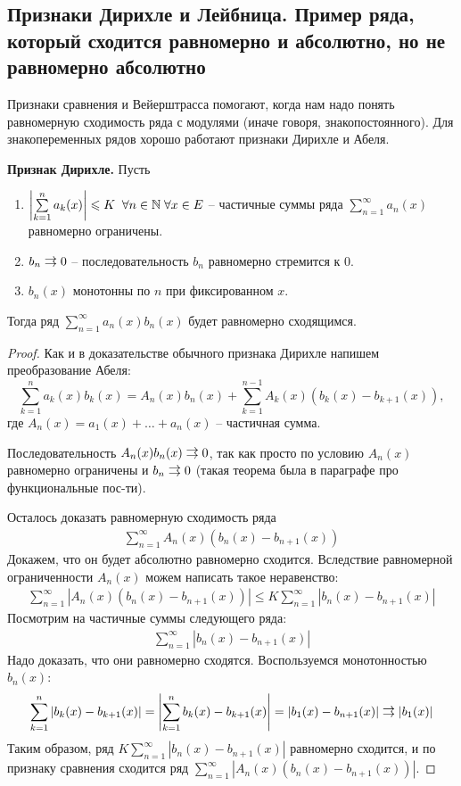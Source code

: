 \subsection{Признаки Дирихле и Лейбница. Пример ряда, который сходится равномерно и абсолютно, но не равномерно абсолютно}
Признаки сравнения и Вейерштрасса помогают, когда нам надо понять равномерную сходимость ряда с модулями (иначе говоря, знакопостоянного).
Для знакопеременных рядов хорошо работают признаки Дирихле и Абеля.

\textbf{Признак Дирихле.} 
Пусть \begin{enumerate}
    \item $\left| \sum\limits_{k = 1}^n a_k(x) \right| \leqslant K \;\; \forall n \in \mathbb{N} \; \forall x \in E$ -- частичные суммы ряда $\sum\limits_{n = 1}^\infty a_n(x)$ равномерно ограничены.
    \item $b_n \doublerightarrow 0$ -- последовательность $b_n$ равномерно стремится к 0.
    \item $b_n(x)$ монотонны по $n$ при фиксированном $x$.
\end{enumerate}
Тогда ряд $\sum\limits_{n = 1}^\infty a_n(x)b_n(x)$ будет равномерно сходящимся.

\begin{proof}
    Как и в доказательстве обычного признака Дирихле напишем преобразование Абеля: \[ \sum_{k=1}^n a_k(x)b_k(x) = A_n(x)b_n(x) + \sum_{k=1}^{n-1} A_k(x)(b_k(x) - b_{k+1}(x)), \]
    где $A_n(x) = a_1(x) + \dots + a_n(x)$ -- частичная сумма.

    \quad Последовательность $A_n(x)b_n(x) \doublerightarrow 0$, так как просто по условию $A_n(x)$ равномерно ограничены и $b_n \doublerightarrow 0$ (такая теорема была в параграфе про функциональные пос-ти).

    \quad Осталось доказать равномерную сходимость ряда 
    \begin{gather*}
        \sum\limits_{n = 1}^\infty A_n(x)(b_n(x) - b_{n+1}(x))
    \end{gather*}
    Докажем, что он будет абсолютно равномерно сходится.
    Вследствие равномерной ограниченности $A_n(x)$ можем написать такое неравенство: 
    \begin{gather*}
        \sum\limits_{n = 1}^\infty \left|A_n(x)(b_n(x) - b_{n+1}(x))\right| \leqslant K\sum\limits_{n = 1}^\infty \left|b_n(x) - b_{n+1}(x)\right|
    \end{gather*}
    Посмотрим на частичные суммы следующего ряда:
    \begin{gather*}
        \sum\limits_{n = 1}^\infty \left|b_n(x) - b_{n+1}(x)\right|
    \end{gather*}
    Надо доказать, что они равномерно сходятся.
    Воспользуемся монотонностью $b_n(x)$: \[ \sum\limits_{k = 1}^n \left|b_k(x) - b_{k+1}(x)\right| = \left|\sum\limits_{k = 1}^n b_k(x) - b_{k+1}(x)\right| = |b_1(x) - b_{n+1}(x)| \doublerightarrow |b_1(x)| \]
    \quad Таким образом, ряд $K\sum\limits_{n = 1}^\infty \left|b_n(x) - b_{n+1}(x)\right|$ равномерно сходится, и по признаку сравнения сходится ряд $\sum\limits_{n = 1}^\infty \left|A_n(x)(b_n(x) - b_{n+1}(x))\right|$.
\end{proof}

